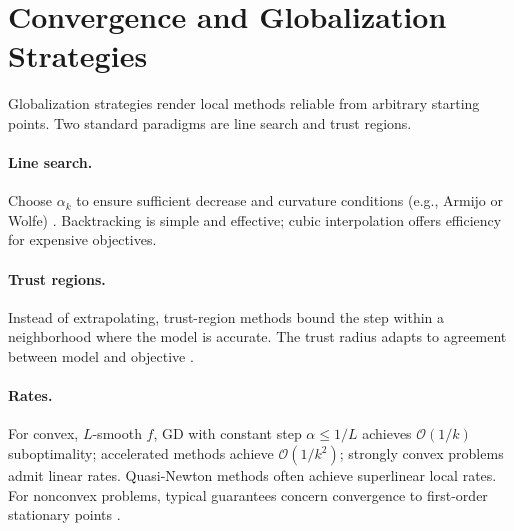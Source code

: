 \section{Convergence and Globalization Strategies}
\label{sec:convergence}
Globalization strategies render local methods reliable from arbitrary starting points. Two standard paradigms are line search and trust regions.

\paragraph{Line search.} Choose $\alpha_k$ to ensure sufficient decrease and curvature conditions (e.g., Armijo or Wolfe) \cite{armijo1966minimization,wolfe1969convergence}. Backtracking is simple and effective; cubic interpolation offers efficiency for expensive objectives.

\paragraph{Trust regions.} Instead of extrapolating, trust-region methods bound the step within a neighborhood where the model is accurate. The trust radius adapts to agreement between model and objective \cite{more1983computing}.

\paragraph{Rates.} For convex, $L$-smooth $f$, GD with constant step $\alpha\le 1/L$ achieves $\mathcal{O}(1/k)$ suboptimality; accelerated methods achieve $\mathcal{O}(1/k^2)$; strongly convex problems admit linear rates. Quasi-Newton methods often achieve superlinear local rates. For nonconvex problems, typical guarantees concern convergence to first-order stationary points \cite{nocedal2006numerical,nesterov2004introductory}.